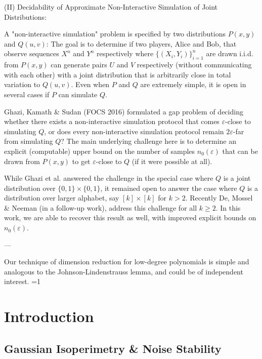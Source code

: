 \documentclass[11pt]{article}
\def \todotoggle{0}
\providecommand{\todotoggle}{1} %
\newcommand{\tableoftodos}{\ifnum\todotoggle=1 \listoftodos[Comments/To Do's] \fi}
\begin{document}
(II) Decidability of Approximate Non-Interactive Simulation of Joint Distributions:

A "non-interactive simulation" problem is specified by two distributions $P(x,y)$ and $Q(u,v)$: The goal is to determine if two players, Alice and Bob, that observe sequences $X^n$ and $Y^n$ respectively where $\{(X_i, Y_i)\}_{i=1}^n$ are drawn i.i.d. from $P(x,y)$ can generate pairs $U$ and $V$ respectively  (without communicating with each other) with a joint distribution that is arbitrarily close in total variation to $Q(u,v)$. Even when $P$ and $Q$ are extremely simple, it is open in several cases if $P$ can simulate $Q$.

Ghazi, Kamath & Sudan (FOCS 2016) formulated a gap problem of deciding whether there exists a non-interactive simulation protocol that comes $\varepsilon$-close to simulating $Q$, or does every non-interactive simulation protocol remain $2\varepsilon$-far from simulating $Q$? The main underlying challenge here is to determine an explicit (computable) upper bound on the number of samples $n_0(\varepsilon)$ that can be drawn from $P(x,y)$ to get $\varepsilon$-close to $Q$ (if it were possible at all).

While Ghazi et al. answered the challenge in the special case where $Q$ is a joint distribution over $\{0,1\} \times \{0,1\}$, it remained open to answer the case where $Q$ is a distribution over larger alphabet, say $[k] \times [k]$ for $k > 2$. Recently De, Mossel & Neeman (in a follow-up work), address this challenge for all $k \ge 2$. In this work, we are able to recover this result as well, with improved explicit bounds on $n_0(\varepsilon)$.

---

Our technique of dimension reduction for low-degree polynomials is simple and analogous to the Johnson-Lindenstrauss lemma, and could be of independent interest.
\fi
\thispagestyle{empty}
\newpage
\thispagestyle{empty}
\tableofcontents
\tableoftodos
\newpage
\setcounter{page}{1}
\newcommand{\R}{\mathbb{R}}

\section{Introduction} \label{sec:intro}

\subsection{Gaussian Isoperimetry \& Noise Stability} 
\end{document}
